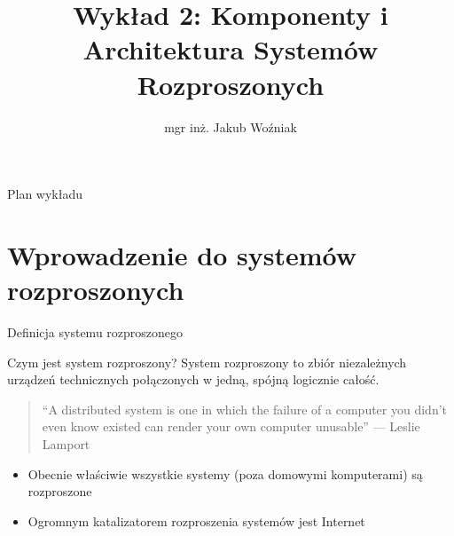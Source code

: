 \documentclass[aspectratio=169]{beamer}
\title{Wykład 2: Komponenty i Architektura Systemów Rozproszonych}
\author{mgr inż. Jakub Woźniak}
\institute{Instytut Informatyki Politechniki Poznańskiej}
\date{}
\begin{document}
\begin{frame}
    \titlepage
\end{frame}

\begin{frame}{Plan wykładu}
    \tableofcontents
\end{frame}

\section{Wprowadzenie do systemów rozproszonych}

\begin{frame}{Definicja systemu rozproszonego}
    \begin{block}{Czym jest system rozproszony?}
        System rozproszony to zbiór niezależnych urządzeń technicznych połączonych w jedną, spójną logicznie całość.
    \end{block}
    
    \begin{quote}
        \small ``A distributed system is one in which the failure of a computer you didn't even know existed can render your own computer unusable'' --- Leslie Lamport
    \end{quote}
    
    \vspace{0.5cm}
    
    \begin{itemize}
        \item Obecnie właściwie wszystkie systemy (poza domowymi komputerami) są rozproszone
        \item Ogromnym katalizatorem rozproszenia systemów jest Internet
    \end{itemize}
\end{frame}
\end{document}
